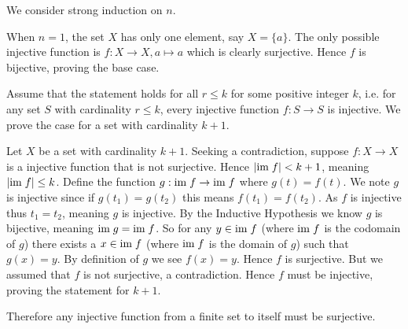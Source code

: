 \begin{questions}
    \item We consider strong induction on $n$.

    When $n = 1$, the set $X$ has only one element, say $X = \{a\}$. The only possible injective function is $f: X \to X, a \mapsto a$ which is clearly surjective. Hence $f$ is bijective, proving the base case.

    Assume that the statement holds for all $r \leq k$ for some positive integer $k$, i.e. for any set $S$ with cardinality $r \leq k$, every injective function $f: S \to S$ is injective. We prove the case for a set with cardinality $k + 1$.

    Let $X$ be a set with cardinality $k + 1$. Seeking a contradiction, suppose $f: X \to X$ is a injective function that is not surjective. Hence $|\mathrm{im}\; f| < k + 1$, meaning $|\mathrm{im}\; f| \leq k$. Define the function $g: \mathrm{im}\; f \to \mathrm{im}\; f$ where $g(t) = f(t)$. We note $g$ is injective since if $g(t_1) = g(t_2)$ this means $f(t_1) = f(t_2)$. As $f$ is injective thus $t_1 = t_2$, meaning $g$ is injective. By the Inductive Hypothesis we know $g$ is bijective, meaning $\mathrm{im}\; g = \mathrm{im}\; f$. So for any $y \in \mathrm{im}\; f$ (where $\mathrm{im}\; f$ is the codomain of $g$) there exists a $x \in \mathrm{im}\; f$ (where $\mathrm{im}\; f$ is the domain of $g$) such that $g(x) = y$. By definition of $g$ we see $f(x) = y$. Hence $f$ is surjective. But we assumed that $f$ is not surjective, a contradiction. Hence $f$ must be injective, proving the statement for $k + 1$.

    Therefore any injective function from a finite set to itself must be surjective.
\end{questions}
